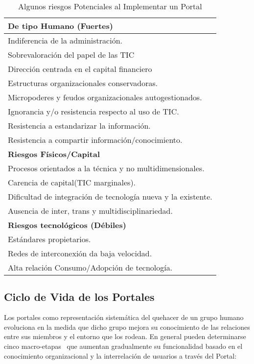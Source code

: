\begin{table}
\begin{center}
\begin{tabular}{|l|}
\hline
\textbf{De tipo Humano (Fuertes)}\\
\hline
Indiferencia de la administración.\\
Sobrevaloración del papel de las TIC\\
Dirección centrada en el capital financiero\\
Estructuras organizacionales conservadoras.\\
Micropoderes y feudos organizacionales autogestionados.\\
Ignorancia y/o resistencia respecto al uso de TIC.\\
Resistencia a estandarizar la información.\\
Resistencia a compartir información/conocimiento.\\
\hline
\textbf{Riesgos Físicos/Capital}\\
\hline
Procesos orientados a la técnica y no multidimensionales.\\
Carencia de capital(TIC marginales).\\
Dificultad de integración de tecnología nueva y la existente.\\
Ausencia de inter, trans y multidisciplinariedad.\\
\hline
\textbf{Riesgos tecnológicos (Débiles)}\\
\hline
Estándares propietarios.\\
Redes de interconexión da baja velocidad.\\
Alta relación Consumo/Adopción de tecnología.\\
\hline
\end{tabular}
\caption{Algunos riesgos Potenciales al Implementar un Portal}
\label{riesgos} 
\end{center}
\end{table}

\subsection{Ciclo de Vida de los Portales}
Los portales como representación sistemática del quehacer de un grupo humano evoluciona en la medida que dicho grupo mejora su conocimiento de las relaciones entre sus miembros y el entorno que los rodean. En general pueden determinarse cinco macro-etapas~\cite{egovernment} que aumentan gradualmente su funcionalidad basado en el  conocimiento organizacional y la interrelación de usuarios a través del Portal:

